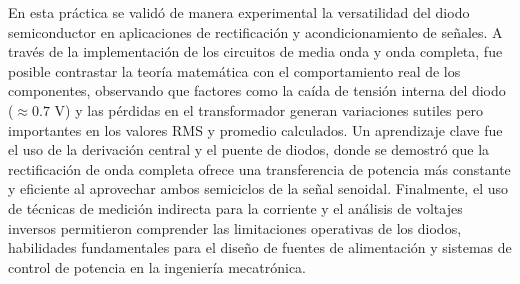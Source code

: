 \documentclass[journal]{IEEEtran}
\begin{document}
\begin{itemize}
    \newline En esta práctica se validó de manera experimental la versatilidad del diodo semiconductor en aplicaciones de rectificación y acondicionamiento de señales. A través de la implementación de los circuitos de media onda y onda completa, fue posible contrastar la teoría matemática con el comportamiento real de los componentes, observando que factores como la caída de tensión interna del diodo ($\approx 0.7\text{ V}$) y las pérdidas en el transformador generan variaciones sutiles pero importantes en los valores RMS y promedio calculados. Un aprendizaje clave fue el uso de la derivación central y el puente de diodos, donde se demostró que la rectificación de onda completa ofrece una transferencia de potencia más constante y eficiente al aprovechar ambos semiciclos de la señal senoidal. Finalmente, el uso de técnicas de medición indirecta para la corriente y el análisis de voltajes inversos permitieron comprender las limitaciones operativas de los diodos, habilidades fundamentales para el diseño de fuentes de alimentación y sistemas de control de potencia en la ingeniería mecatrónica.

\end{itemize}




%
\end{document}
